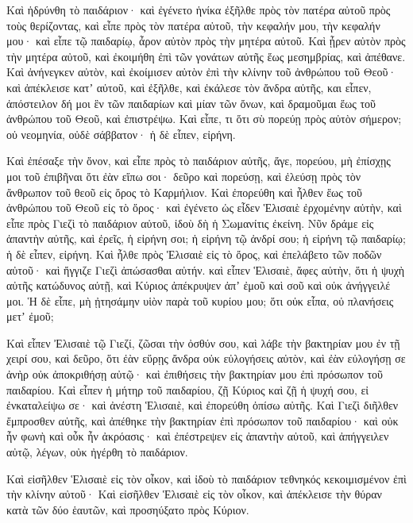 {\par }{\PP {}Καὶ ἡδρύνθη τὸ παιδάριον· καὶ ἐγένετο ἡνίκα ἐξῆλθε πρὸς τὸν πατέρα αὐτοῦ πρὸς τοὺς θερίζοντας,
καὶ εἶπε πρὸς τὸν πατέρα αὐτοῦ, τὴν κεφαλήν μου, τὴν κεφαλήν μου· καὶ εἶπε τῷ παιδαρίῳ, ἆρον αὐτὸν πρὸς τὴν μητέρα αὐτοῦ.
Καὶ ᾖρεν αὐτὸν πρὸς τὴν μητέρα αὐτοῦ, καὶ ἐκοιμήθη ἐπὶ τῶν γονάτων αὐτῆς ἕως μεσημβρίας, καὶ ἀπέθανε.
Καὶ ἀνήνεγκεν αὐτὸν, καὶ ἐκοίμισεν αὐτὸν ἐπὶ τὴν κλίνην τοῦ ἀνθρώπου τοῦ Θεοῦ· καὶ ἀπέκλεισε κατʼ αὐτοῦ, καὶ ἐξῆλθε,
καὶ ἐκάλεσε τὸν ἄνδρα αὐτῆς, και εἶπεν, ἀπόστειλον δή μοι ἓν τῶν παιδαρίων καὶ μίαν τῶν ὄνων, καὶ δραμοῦμαι ἕως τοῦ ἀνθρώπου τοῦ Θεοῦ, καὶ ἐπιστρέψω.
Καὶ εἶπε, τι ὅτι σὺ πορεύῃ πρὸς αὐτὸν σήμερον; οὐ νεομηνία, οὐδὲ σάββατον· ἡ δὲ εἶπεν, εἰρήνη.
\par }{\PP {}Καὶ ἐπέσαξε τὴν ὄνον, καὶ εἶπε πρὸς τὸ παιδάριον αὐτῆς, ἄγε, πορεύου, μὴ ἐπίσχῃς μοι τοῦ ἐπιβῆναι ὅτι ἐὰν εἴπω σοι· δεῦρο καὶ πορεύσῃ, καὶ ἐλεύσῃ πρὸς τὸν ἄνθρωπον τοῦ θεοῦ εἰς ὄρος τὸ Καρμήλιον.
Καὶ ἐπορεύθη καὶ ἦλθεν ἕως τοῦ ἀνθρώπου τοῦ Θεοῦ εἰς τὸ ὄρος· καὶ ἐγένετο ὡς εἶδεν Ἑλισαιὲ ἐρχομένην αὐτὴν, καὶ εἶπε πρὸς Γιεζὶ τὸ παιδάριον αὐτοῦ, ἰδοὺ δὴ ἡ Σωμανίτις ἐκείνη.
Νῦν δράμε εἰς ἀπαντὴν αὐτῆς, καὶ ἐρεῖς, ἡ εἰρήνη σοι; ἡ εἰρήνη τῷ ἀνδρί σου; ἡ εἰρήνη τῷ παιδαρίῳ; ἡ δὲ εἶπεν, εἰρήνη.
Καὶ ἦλθε πρὸς Ἑλισαιὲ εἰς τὸ ὄρος, καὶ ἐπελάβετο τῶν ποδῶν αὐτοῦ· καὶ ἤγγιζε Γιεζὶ ἀπώσασθαι αὐτήν. καὶ εἶπεν Ἑλισαιὲ, ἄφες αὐτὴν, ὅτι ἡ ψυχὴ αὐτῆς κατώδυνος αὐτῇ, καὶ Κύριος ἀπέκρυψεν ἀπʼ ἐμοῦ καὶ σοῦ καὶ οὐκ ἀνήγγειλέ μοι.
Ἡ δὲ εἶπε, μὴ ᾐτησάμην υἱὸν παρὰ τοῦ κυρίου μου; ὅτι οὐκ εἶπα, οὐ πλανήσεις μετʼ ἐμοῦ;
\par }{\PP {}Καὶ εἶπεν Ἐλισαιὲ τῷ Γιεζί, ζῶσαι τὴν ὀσθύν σου, καὶ λάβε τὴν βακτηρίαν μου ἐν τῇ χειρί σου, καὶ δεῦρο, ὅτι ἐὰν εὕρῃς ἄνδρα οὐκ εὐλογήσεις αὐτὸν, καὶ ἐὰν εὐλογήσῃ σε ἀνὴρ οὐκ ἀποκριθήσῃ αὐτῷ· καὶ ἐπιθήσεις τὴν βακτηρίαν μου ἐπὶ πρόσωπον τοῦ παιδαρίου.
Καὶ εἶπεν ἡ μήτηρ τοῦ παιδαρίου, ζῇ Κύριος καὶ ζῇ ἡ ψυχή σου, εἰ ἐνκαταλείψω σε· καὶ ἀνέστη Ἑλισαιὲ, καὶ ἐπορεύθη ὀπίσω αὐτῆς.
Καὶ Γιεζὶ διῆλθεν ἔμπροσθεν αὐτῆς, καὶ ἀπέθηκε τὴν βακτηρίαν ἐπὶ πρόσωπον τοῦ παιδαρίου· καὶ οὐκ ἦν φωνὴ καὶ οὖκ ἦν ἀκρόασις· καὶ ἐπέστρεψεν εἰς ἀπαντὴν αὐτοῦ, καὶ ἀπήγγειλεν αὐτῷ, λέγων, οὐκ ἠγέρθη τὸ παιδάριον.
\par }{\PP {}Καὶ εἰσῆλθεν Ἑλισαιὲ εἰς τὸν οἶκον, καὶ ἰδοὺ τὸ παιδάριον τεθνηκός κεκοιμισμένον ἐπὶ τὴν κλίνην αὐτοῦ·
Καὶ εἰσῆλθεν Ἑλισαιὲ εἰς τὸν οἶκον, καὶ ἀπέκλεισε τὴν θύραν κατὰ τῶν δύο ἑαυτῶν, καὶ προσηύξατο πρὸς Κύριον.
}
